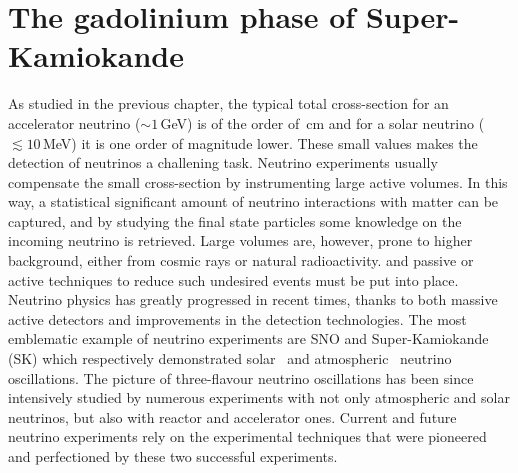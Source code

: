 \chapter{The gadolinium phase of Super-Kamiokande}
\label{sec:skgd}

As studied in the previous chapter, the typical total cross-section for an accelerator neutrino ($\sim1$\,GeV) %
is of the order of \,cm and for a solar neutrino ($\lesssim10$\,MeV) %
it is one order of magnitude lower.
These small values makes the detection of neutrinos a challening task.
Neutrino experiments usually compensate the small cross-section by instrumenting large active volumes.
In this way, a statistical significant amount of neutrino interactions with matter can be captured, %
and by studying the final state particles some knowledge on the incoming neutrino is retrieved.
Large volumes are, however, prone to higher background, either from cosmic rays or natural radioactivity.
and passive or active techniques to reduce such undesired events must be put into place.
Neutrino physics has greatly progressed in recent times, thanks to both massive active detectors and %
improvements in the detection technologies.
The most emblematic example of neutrino experiments are SNO and Super-Kamiokande (SK) %
which respectively demonstrated solar~\cite{Aharmim:2005gt} and atmospheric~\cite{Fukuda:1998mi} neutrino oscillations.
The picture of three-flavour neutrino oscillations has been since intensively studied %
by numerous experiments with not only atmospheric and solar neutrinos, but also with reactor and accelerator ones.
Current and future neutrino experiments rely on the experimental techniques that were pioneered and perfectioned %
by these two successful experiments.


